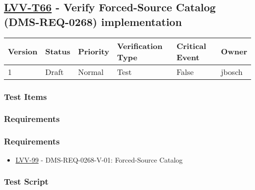 \hypertarget{lvv-t66---verify-forced-source-catalog-dms-req-0268-implementation}{%
\subsection{\texorpdfstring{\href{https://jira.lsstcorp.org/secure/Tests.jspa\#/testCase/LVV-T66}{LVV-T66}
- Verify Forced-Source Catalog (DMS-REQ-0268)
implementation}{LVV-T66 - Verify Forced-Source Catalog (DMS-REQ-0268) implementation}}\label{lvv-t66---verify-forced-source-catalog-dms-req-0268-implementation}}

\begin{longtable}[]{@{}llllll@{}}
\toprule
Version & Status & Priority & Verification Type & Critical Event &
Owner\tabularnewline
\midrule
\endhead
1 & Draft & Normal & Test & False & jbosch\tabularnewline
\bottomrule
\end{longtable}

\hypertarget{test-items-20}{%
\subsubsection{Test Items}\label{test-items-20}}

\hypertarget{requirements-40}{%
\subsubsection{Requirements}\label{requirements-40}}

\hypertarget{requirements-41}{%
\subsubsection{Requirements}\label{requirements-41}}

\begin{itemize}
\tightlist
\item
  \href{https://jira.lsstcorp.org/browse/LVV-99}{LVV-99} -
  DMS-REQ-0268-V-01: Forced-Source Catalog
\end{itemize}

\hypertarget{test-script-20}{%
\subsubsection{Test Script}\label{test-script-20}}

